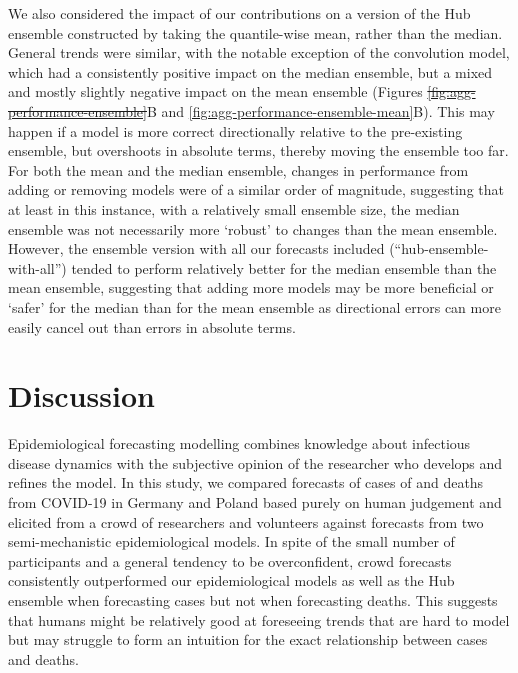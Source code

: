 \documentclass[
]{article}
\providecommand{\DIFaddtex}[1]{{\protect\color{blue}\uwave{#1}}} %
\providecommand{\DIFdeltex}[1]{{\protect\color{red}\sout{#1}}}                      %
\providecommand{\DIFaddbegin}{} %
\providecommand{\DIFaddend}{} %
\providecommand{\DIFdelbegin}{} %
\providecommand{\DIFdelend}{} %
\providecommand{\DIFadd}[1]{\texorpdfstring{\DIFaddtex{#1}}{#1}} %
\providecommand{\DIFdel}[1]{\texorpdfstring{\DIFdeltex{#1}}{}} %
\newcommand{\DIFscaledelfig}{0.5}
\newlength{\DIFdelgraphicswidth} %
\newlength{\DIFdelgraphicsheight} %
\newcommand{\DIFaddincludegraphics}[2][]{{\color{blue}\fbox{\DIFOincludegraphics[#1]{#2}}}} %
\newcommand{\DIFdelincludegraphics}[2][]{%
\sbox{\DIFdelgraphicsbox}{\DIFOincludegraphics[#1]{#2}}%
\settoboxwidth{\DIFdelgraphicswidth}{\DIFdelgraphicsbox} %
\settoboxtotalheight{\DIFdelgraphicsheight}{\DIFdelgraphicsbox} %
\scalebox{\DIFscaledelfig}{%
\parbox[b]{\DIFdelgraphicswidth}{\usebox{\DIFdelgraphicsbox}\\[-\baselineskip] \rule{\DIFdelgraphicswidth}{0em}}\llap{\resizebox{\DIFdelgraphicswidth}{\DIFdelgraphicsheight}{%
\setlength{\unitlength}{\DIFdelgraphicswidth}%
\begin{picture}(1,1)%
\thicklines\linethickness{2pt} %
{\color[rgb]{1,0,0}\put(0,0){\framebox(1,1){}}}%
{\color[rgb]{1,0,0}\put(0,0){\line( 1,1){1}}}%
{\color[rgb]{1,0,0}\put(0,1){\line(1,-1){1}}}%
\end{picture}%
}\hspace*{3pt}}} %
} %
\DeclareRobustCommand{\DIFaddbegin}{\DIFOaddbegin \let\includegraphics\DIFaddincludegraphics} %
\DeclareRobustCommand{\DIFaddend}{\DIFOaddend \let\includegraphics\DIFOincludegraphics} %
\DeclareRobustCommand{\DIFdelbegin}{\DIFOdelbegin \let\includegraphics\DIFdelincludegraphics} %
\DeclareRobustCommand{\DIFdelend}{\DIFOaddend \let\includegraphics\DIFOincludegraphics} %
\begin{document}
We also considered the impact of our contributions on a version of the Hub ensemble constructed by taking the quantile-wise mean, rather than the median.
General trends were similar, with the notable exception of the convolution model, which had a consistently positive impact on the median ensemble, but a mixed and mostly slightly negative impact on the mean ensemble (Figures \DIFdelbegin \DIFdel{\ref{fig:agg-performance-ensemble}}\DIFdelend \DIFaddbegin \DIFadd{\ref{fig:agg-performance-ensemble-rel}}\DIFaddend B and \ref{fig:agg-performance-ensemble-mean}B). This may happen if a model is more correct directionally relative to the pre-existing ensemble, but overshoots in absolute terms, thereby moving the ensemble too far. For both the mean and the median ensemble, changes in performance from adding or removing models were of a similar order of magnitude, suggesting that at least in this instance, with a relatively small ensemble size, the median ensemble was not necessarily more `robust' to changes than the mean ensemble. However, the ensemble version with all our forecasts included (``hub-ensemble-with-all'') tended to perform relatively better for the median ensemble than the mean ensemble, suggesting that adding more models may be more beneficial or `safer' for the median than for the mean ensemble as directional errors can more easily cancel out than errors in absolute terms.

\hypertarget{discussion}{%
\section{Discussion}\label{discussion}}

Epidemiological forecasting modelling combines knowledge about infectious disease dynamics with the subjective opinion of the researcher who develops and refines the model. In this study, we compared forecasts of cases of and deaths from COVID-19 in Germany and Poland based purely on human judgement and elicited from a crowd of researchers and volunteers against forecasts from two semi-mechanistic epidemiological models. In spite of the small number of participants and a general tendency to be overconfident, crowd forecasts consistently outperformed our epidemiological models as well as the Hub ensemble when forecasting cases but not when forecasting deaths. This suggests that humans might be relatively good at foreseeing trends that are hard to model but may struggle to form an intuition for the exact relationship between cases and deaths.
\end{document}
